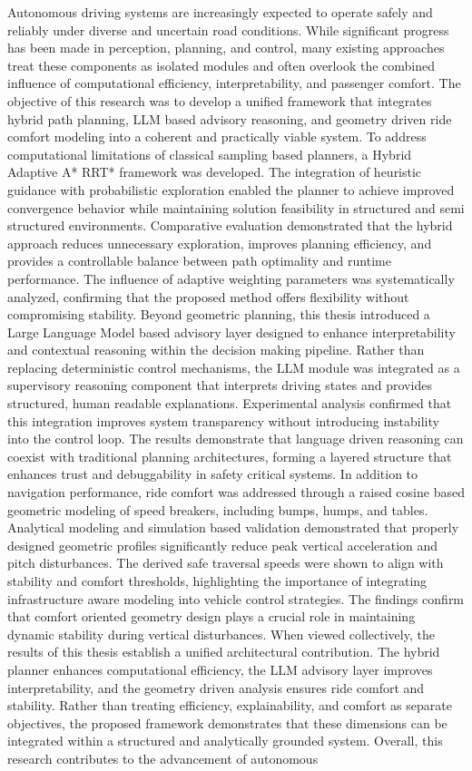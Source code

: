 \documentclass[a4paper,12pt,one side]{report}
\theoremstyle{definition}
\begin{document}
\begin{itemize}
Autonomous driving systems are increasingly expected to operate safely and reliably under diverse and uncertain road conditions. While significant progress has been made in perception, planning, and control, many existing approaches treat these components as isolated modules and often overlook the combined influence of computational efficiency, interpretability, and passenger comfort. The objective of this research was to develop a unified framework that integrates hybrid path planning, LLM based advisory reasoning, and geometry driven ride comfort modeling into a coherent and practically viable system. To address computational limitations of classical sampling based planners, a Hybrid Adaptive A* RRT* framework was developed. The integration of heuristic guidance with probabilistic exploration enabled the planner to achieve improved convergence behavior while maintaining solution feasibility in structured and semi structured environments. Comparative evaluation demonstrated that the hybrid approach reduces unnecessary exploration, improves planning efficiency, and provides a controllable balance between path optimality and runtime performance. The influence of adaptive weighting parameters was systematically analyzed, confirming that the proposed method offers flexibility without compromising stability. Beyond geometric planning, this thesis introduced a Large Language Model based advisory layer designed to enhance interpretability and contextual reasoning within the decision making pipeline. Rather than replacing deterministic control mechanisms, the LLM module was integrated as a supervisory reasoning component that interprets driving states and provides structured, human readable explanations. Experimental analysis confirmed that this integration improves system transparency without introducing instability into the control loop. The results demonstrate that language driven reasoning can coexist with traditional planning architectures, forming a layered structure that enhances trust and debuggability in safety critical systems. In addition to navigation performance, ride comfort was addressed through a raised cosine based geometric modeling of speed breakers, including bumps, humps, and tables. Analytical modeling and simulation based validation demonstrated that properly designed geometric profiles significantly reduce peak vertical acceleration and pitch disturbances. The derived safe traversal speeds were shown to align with stability and comfort thresholds, highlighting the importance of integrating infrastructure aware modeling into vehicle control strategies. The findings confirm that comfort oriented geometry design plays a crucial role in maintaining dynamic stability during vertical disturbances. When viewed collectively, the results of this thesis establish a unified architectural contribution. The hybrid planner enhances computational efficiency, the LLM advisory layer improves interpretability, and the geometry driven analysis ensures ride comfort and stability. Rather than treating efficiency, explainability, and comfort as separate objectives, the proposed framework demonstrates that these dimensions can be integrated within a structured and analytically grounded system. Overall, this research contributes to the advancement of autonomous 
\end{itemize}
\end{document}

